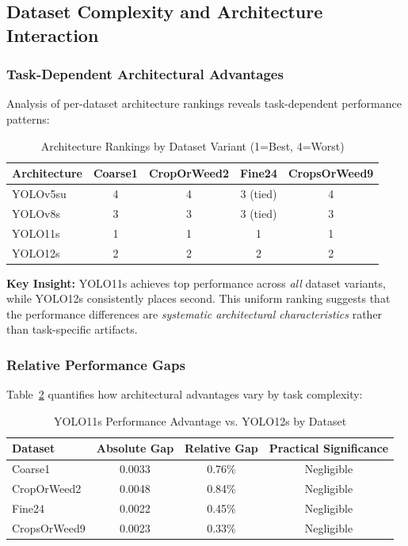 \subsection{Dataset Complexity and Architecture Interaction}

\subsubsection{Task-Dependent Architectural Advantages}

Analysis of per-dataset architecture rankings reveals task-dependent performance patterns:

\begin{table}[htbp]
\centering
\caption{Architecture Rankings by Dataset Variant (1=Best, 4=Worst)}
\label{tab:architecture_rankings}
\begin{tabular}{lcccc}
\toprule
\textbf{Architecture} & \textbf{Coarse1} & \textbf{CropOrWeed2} & \textbf{Fine24} & \textbf{CropsOrWeed9} \\
\midrule
YOLOv5su & 4 & 4 & 3 (tied) & 4 \\
YOLOv8s  & 3 & 3 & 3 (tied) & 3 \\
YOLO11s  & 1 & 1 & 1 & 1 \\
YOLO12s  & 2 & 2 & 2 & 2 \\
\bottomrule
\end{tabular}
\end{table}

\textbf{Key Insight:} YOLO11s achieves top performance across \textit{all} dataset variants, while YOLO12s consistently places second. This uniform ranking suggests that the performance differences are \textit{systematic architectural characteristics} rather than task-specific artifacts.

\subsubsection{Relative Performance Gaps}

Table~\ref{tab:relative_gaps} quantifies how architectural advantages vary by task complexity:

\begin{table}[htbp]
\centering
\caption{YOLO11s Performance Advantage vs. YOLO12s by Dataset}
\label{tab:relative_gaps}
\begin{tabular}{lccc}
\toprule
\textbf{Dataset} & \textbf{Absolute Gap} & \textbf{Relative Gap} & \textbf{Practical Significance} \\
\midrule
Coarse1      & 0.0033 & 0.76\% & Negligible \\
CropOrWeed2  & 0.0048 & 0.84\% & Negligible \\
Fine24       & 0.0022 & 0.45\% & Negligible \\
CropsOrWeed9 & 0.0023 & 0.33\% & Negligible \\
\bottomrule
\end{tabular}
\end{table}

